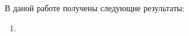 
\conclusion

В даной работе получены следующие результаты:

\begin{enumerate}
    \item
\end{enumerate}
